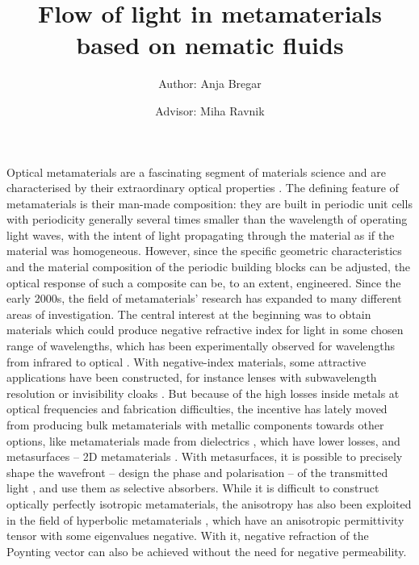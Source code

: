 \documentclass[a4paper,11pt]{article}
\title{\huge{Flow of light in metamaterials based on nematic fluids}}
\author{Author: Anja Bregar \and Advisor: Miha Ravnik}
\begin{document}
\setcounter{page}{11}

\onehalfspacing

\maketitle

% 
% 
% 
%




Optical metamaterials are a fascinating segment of materials science and are characterised by their extraordinary optical properties \cite{wegener-2011-nature-review}.
The defining feature of metamaterials is their man-made composition: they are built in periodic unit cells with periodicity generally several times smaller than the wavelength of operating light waves, with the intent of light propagating through the material as if the material was homogeneous. 
However, since the specific geometric characteristics and the material composition of the periodic building blocks can be adjusted, the optical response of such a composite can be, to an extent, engineered. 
Since the early 2000s, the field of metamaterials' research has expanded to many different areas of investigation. 
The central interest at the beginning was to obtain materials which could produce negative refractive index for light in some chosen range of wavelengths, which has been experimentally observed for wavelengths from infrared to optical \cite{schultz-2000-first-mtm,zhang-2008-fishnet}. 
With negative-index materials, some attractive applications have been constructed, for instance lenses with subwavelength resolution or invisibility cloaks \cite{capasso-2016-metalens,zhang-2015-skin-cloak}. 
But because of the high losses inside metals at optical frequencies and fabrication difficulties, the incentive has lately moved from producing bulk metamaterials with metallic components towards other options, like metamaterials made from dielectrics \cite{jacob-2016-all-dielectric}, which have lower losses, and metasurfaces -- 2D metamaterials \cite{meinzer-2014-metasurface}. 
With metasurfaces, it is possible to precisely shape the wavefront -- design the phase and polarisation -- of the transmitted light \cite{capasso-2014-flat-optics-metasurface}, and use them as selective absorbers. 
While it is difficult to construct optically perfectly isotropic metamaterials, the anisotropy has also been exploited in the field of hyperbolic metamaterials \cite{kivshar-2013-hyperbolic}, which have an anisotropic permittivity tensor with some eigenvalues negative. 
With it, negative refraction of the Poynting vector can also be achieved without the need for negative permeability.
\end{document}
